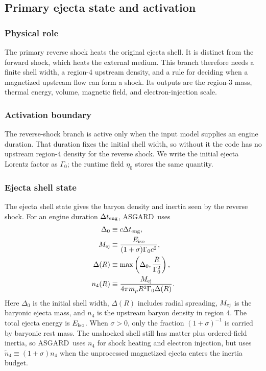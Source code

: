 \documentclass[twocolumn]{aastex702}
\newcommand{\asgard}{\textsc{ASGARD}}
\begin{document}
\subsection{Primary ejecta state and activation}

\subsubsection{Physical role}

The primary reverse shock heats the original ejecta shell.  It is distinct from
the forward shock, which heats the external medium.  This branch therefore needs
a finite shell width, a region-4 upstream density, and a rule for deciding when a
magnetized upstream flow can form a shock.  Its outputs are the region-3 mass,
thermal energy, volume, magnetic field, and electron-injection scale.

\subsubsection{Activation boundary}

The reverse-shock branch is active only when the input model supplies an engine
duration.  That duration fixes the initial shell width, so without it the code has
no upstream region-4 density for the reverse shock.  We write the initial ejecta
Lorentz factor as \(\Gamma_0\); the runtime field \(\eta_0\) stores the same
quantity.

\subsubsection{Ejecta shell state}

The ejecta shell state gives the baryon density and inertia seen by the reverse
shock.  For an engine duration \(\Delta t_{\rm eng}\), \asgard\ uses
\begin{equation}
\begin{aligned}
\Delta_0&\equiv c\Delta t_{\rm eng},\\
M_{\rm ej}&\equiv \frac{E_{\rm iso}}{(1+\sigma)\Gamma_0c^2},\\
\Delta(R)&\equiv \max\left(\Delta_0,\frac{R}{\Gamma_0^2}\right),\\
n_4(R)&\equiv \frac{M_{\rm ej}}
{4\pi m_pR^2\Gamma_0\Delta(R)} .
\end{aligned}
\end{equation}
Here \(\Delta_0\) is the initial shell width, \(\Delta(R)\) includes radial
spreading, \(M_{\rm ej}\) is the baryonic ejecta mass, and \(n_4\) is the
upstream baryon density in region 4.  The total ejecta energy is \(E_{\rm iso}\).
When \(\sigma>0\), only the fraction \((1+\sigma)^{-1}\) is carried by baryonic
rest mass.  The unshocked shell still has matter plus ordered-field inertia, so
\asgard\ uses \(n_4\) for shock heating and electron injection, but uses
\(\tilde n_4\equiv(1+\sigma)n_4\) when the unprocessed magnetized ejecta enters
the inertia budget.
\end{document}
